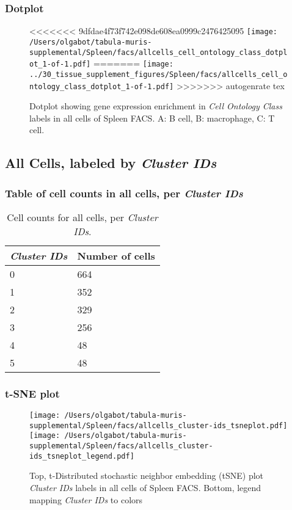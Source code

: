 \clearpage

\subsubsection{Dotplot}
\begin{figure}[h]
\centering
<<<<<<< 9dfdae4f73f742e098de608ea0999c2476425095
\texttt{[image: /Users/olgabot/tabula-muris-supplemental/Spleen/facs/allcells\_cell\_ontology\_class\_dotplot\_1-of-1.pdf]}
=======
\texttt{[image: ../30\_tissue\_supplement\_figures/Spleen/facs/allcells\_cell\_ontology\_class\_dotplot\_1-of-1.pdf]}
>>>>>>> autogenrate tex

\caption{ Dotplot  showing gene expression enrichment in \emph{Cell Ontology Class} labels in all cells of Spleen FACS. A: B cell, B: macrophage, C: T cell.}
\end{figure}


\clearpage

\subsection{All Cells, labeled by \emph{Cluster IDs}}
\subsubsection{Table of cell counts in all cells, per \emph{Cluster IDs}}\begin{table}[h]
\centering
\label{my-label}
\begin{tabular}{@{}ll@{}}
\toprule

\emph{Cluster IDs}& Number of cells \\ \midrule
0 & 664 \\

1 & 352 \\

2 & 329 \\

3 & 256 \\

4 & 48 \\

5 & 48 \\
\bottomrule
\end{tabular}
\caption{Cell counts for all cells, per \emph{Cluster IDs}.}
\end{table}

\clearpage
\subsubsection{t-SNE plot}
\begin{figure}[h]
\centering
\texttt{[image: /Users/olgabot/tabula-muris-supplemental/Spleen/facs/allcells\_cluster-ids\_tsneplot.pdf]}
\texttt{[image: /Users/olgabot/tabula-muris-supplemental/Spleen/facs/allcells\_cluster-ids\_tsneplot\_legend.pdf]}
\caption{Top, t-Distributed stochastic neighbor embedding (tSNE) plot  \emph{Cluster IDs} labels in all cells of Spleen FACS. Bottom, legend mapping \emph{Cluster IDs} to colors}
\end{figure}


